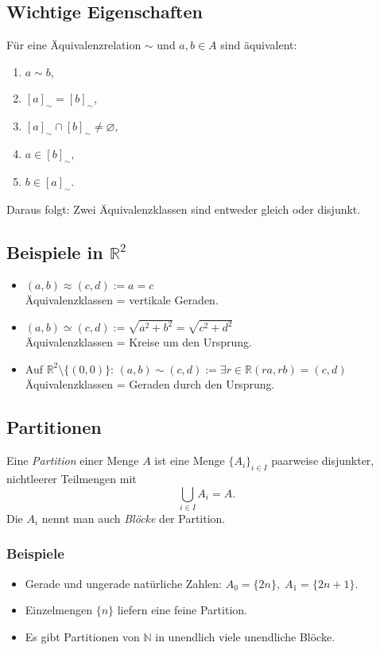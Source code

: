 \subsection{Wichtige Eigenschaften}
Für eine Äquivalenzrelation $\sim$ und $a,b\in A$ sind äquivalent:
\begin{enumerate}
  \item $a\sim b$,
  \item $[a]_\sim = [b]_\sim$,
  \item $[a]_\sim \cap [b]_\sim \neq \varnothing$,
  \item $a\in [b]_\sim$,
  \item $b\in [a]_\sim$.
\end{enumerate}
Daraus folgt: Zwei Äquivalenzklassen sind entweder gleich oder disjunkt.

\subsection{Beispiele in $\mathbb{R}^2$}
\begin{itemize}
  \item $(a,b)\approx(c,d) := a=c$\\ Äquivalenzklassen = vertikale Geraden.
  \item $(a,b)\simeq(c,d) := \sqrt{a^2+b^2}=\sqrt{c^2+d^2}$\\Äquivalenzklassen = Kreise um den Ursprung.
  \item Auf $\mathbb{R}^2\setminus\{(0,0)\}$: $(a,b)\sim(c,d) := \exists r\in\mathbb{R}(ra,rb)=(c,d)$\\Äquivalenzklassen = Geraden durch den Ursprung.
\end{itemize}



\subsection{Partitionen}
Eine \emph{Partition} einer Menge \(A\) ist eine Menge \(\{A_i\}_{i\in I}\) paarweise disjunkter, nichtleerer Teilmengen mit
\[
\bigcup_{i\in I} A_i = A.
\]
Die \(A_i\) nennt man auch \emph{Blöcke} der Partition.

\subsubsection{Beispiele}
\begin{itemize}
  \item Gerade und ungerade natürliche Zahlen: \(A_0=\{2n\},\; A_1=\{2n+1\}\).
  \item Einzelmengen \(\{n\}\) liefern eine feine Partition.
  \item Es gibt Partitionen von \(\mathbb{N}\) in unendlich viele unendliche Blöcke.
\end{itemize}

